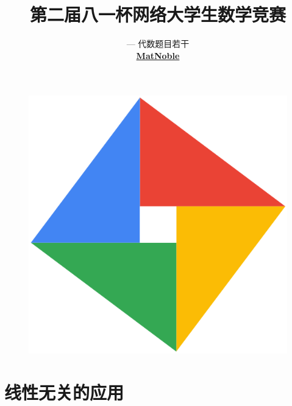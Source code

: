 \documentclass[a4paper, 12pt, UTF8]{ctexart}
\begin{document}
\title{第二届八一杯网络大学生数学竞赛} \author{{\Large --- 代数题目若干}\\ \bf
  \href{https://matnoble.me/about/}{MatNoble}} \date{}

\maketitle
\tableofcontents

\begin{figure}[b]
    \centering
    \includegraphics[width = .25\textwidth]{images/logo.png}
\end{figure}



\clearpage

\section{线性无关的应用}
\end{document}
